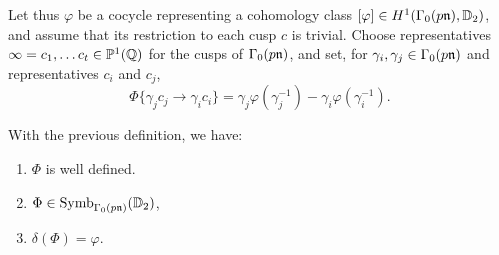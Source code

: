 \documentclass[a4paper,10pt]{article}
\numberwithin{equation}{section}
\begin{document}
Let thus $\varphi$ be a cocycle representing a cohomology class $[\varphi]\in H^1(\Gamma_0(p\mathfrak{n}),\mathbb{D}_2)$, and assume that its restriction to each cusp $c$ is trivial. Choose representatives $\infty=c_1,\ldots c_t\in \mathbb{P}^1(\mathbb{Q})$ for the cusps of $\Gamma_0(p\mathfrak{n})$, and set, for $\gamma_i,\gamma_j\in \Gamma_0(p\mathfrak{n})$ and representatives $c_i$ and $c_j$,
\[
\Phi\{\gamma_j c_j\rightarrow \gamma_i c_i\} = \gamma_j\varphi(\gamma_j^{-1})-\gamma_i\varphi(\gamma_i^{-1}).
\]
\begin{proposition}
With the previous definition, we have:
\begin{enumerate}
    \item $\Phi$ is well defined.
    \item $\Phi\in \mathrm{Symb}_{\Gamma_0(p\mathfrak{n})}(\mathbb{D}_2)$,
    \item $\delta(\Phi)=\varphi$.
\end{enumerate}
\end{proposition}
\end{document}
